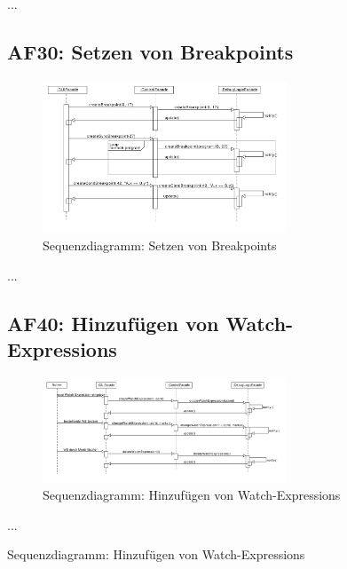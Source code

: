 ﻿\documentclass[parskip=full]{scrartcl}
\begin{document}
\begin{figure}[!h]
...
\newpage
\subsection{AF30: Setzen von Breakpoints}
\begin{figure}[!h]
\centering
\includegraphics[width=0.8\textwidth]{diagrammIdeenUmlet/SequenceDiagrams/seq_breakpointsPDF.pdf}
\caption{Sequenzdiagramm: Setzen von Breakpoints}
\end{figure}

...
\newpage
\subsection{AF40: Hinzufügen von Watch-Expressions}
\begin{figure}[!h]
\centering
\includegraphics[width=0.8\textwidth]{diagrammIdeenUmlet/SequenceDiagrams/seq_WatchExpressionsPDF.pdf}
\caption{Sequenzdiagramm: Hinzufügen von Watch-Expressions}
\end{figure}

...
\newpage

\end{figure}
\end{document}
